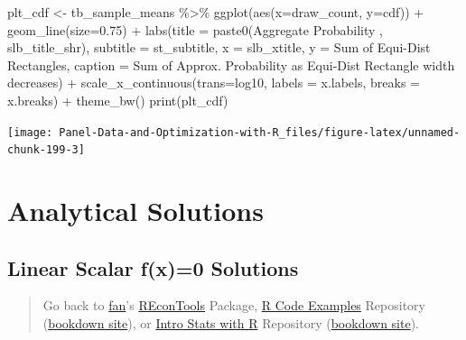 \documentclass[
]{book}
\newenvironment{Shaded}{\begin{snugshade}}{\end{snugshade}}
\newcommand{\AttributeTok}[1]{\textcolor[rgb]{0.77,0.63,0.00}{#1}}
\newcommand{\FloatTok}[1]{\textcolor[rgb]{0.00,0.00,0.81}{#1}}
\newcommand{\FunctionTok}[1]{\textcolor[rgb]{0.00,0.00,0.00}{#1}}
\newcommand{\NormalTok}[1]{#1}
\newcommand{\OtherTok}[1]{\textcolor[rgb]{0.56,0.35,0.01}{#1}}
\newcommand{\SpecialCharTok}[1]{\textcolor[rgb]{0.00,0.00,0.00}{#1}}
\newcommand{\StringTok}[1]{\textcolor[rgb]{0.31,0.60,0.02}{#1}}
\begin{document}
\begin{Shaded}
\begin{Highlighting}[]
\NormalTok{plt\_cdf }\OtherTok{\textless{}{-}}\NormalTok{ tb\_sample\_means }\SpecialCharTok{\%\textgreater{}\%}
  \FunctionTok{ggplot}\NormalTok{(}\FunctionTok{aes}\NormalTok{(}\AttributeTok{x=}\NormalTok{draw\_count, }\AttributeTok{y=}\NormalTok{cdf)) }\SpecialCharTok{+}
  \FunctionTok{geom\_line}\NormalTok{(}\AttributeTok{size=}\FloatTok{0.75}\NormalTok{) }\SpecialCharTok{+}
  \FunctionTok{labs}\NormalTok{(}\AttributeTok{title =} \FunctionTok{paste0}\NormalTok{(}\StringTok{\textquotesingle{}Aggregate Probability \textquotesingle{}}\NormalTok{, slb\_title\_shr),}
       \AttributeTok{subtitle =}\NormalTok{ st\_subtitle,}
       \AttributeTok{x =}\NormalTok{ slb\_xtitle,}
       \AttributeTok{y =} \StringTok{\textquotesingle{}Sum of Equi{-}Dist Rectangles\textquotesingle{}}\NormalTok{,}
       \AttributeTok{caption =} \StringTok{\textquotesingle{}Sum of Approx. Probability as Equi{-}Dist Rectangle width decreases\textquotesingle{}}\NormalTok{) }\SpecialCharTok{+}
  \FunctionTok{scale\_x\_continuous}\NormalTok{(}\AttributeTok{trans=}\StringTok{\textquotesingle{}log10\textquotesingle{}}\NormalTok{, }\AttributeTok{labels =}\NormalTok{ x.labels, }\AttributeTok{breaks =}\NormalTok{ x.breaks) }\SpecialCharTok{+}
  \FunctionTok{theme\_bw}\NormalTok{()}
\FunctionTok{print}\NormalTok{(plt\_cdf)}
\end{Highlighting}
\end{Shaded}

\begin{center}\texttt{[image: Panel-Data-and-Optimization-with-R\_files/figure-latex/unnamed-chunk-199-3]} \end{center}

\hypertarget{analytical-solutions}{%
\section{Analytical Solutions}\label{analytical-solutions}}

\hypertarget{linear-scalar-fx0-solutions}{%
\subsection{Linear Scalar f(x)=0 Solutions}\label{linear-scalar-fx0-solutions}}

\begin{quote}
Go back to \href{http://fanwangecon.github.io/}{fan}'s \href{https://fanwangecon.github.io/REconTools/}{REconTools} Package, \href{https://fanwangecon.github.io/R4Econ/}{R Code Examples} Repository (\href{https://fanwangecon.github.io/R4Econ/bookdown}{bookdown site}), or \href{https://fanwangecon.github.io/Stat4Econ/}{Intro Stats with R} Repository (\href{https://fanwangecon.github.io/Stat4Econ/bookdown}{bookdown site}).
\end{quote}
\end{document}
